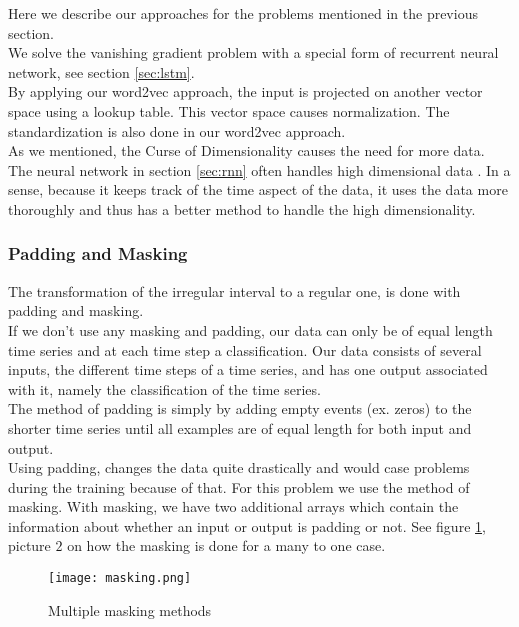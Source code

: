 Here we describe our approaches for the problems mentioned in the previous section. \\
We solve the vanishing gradient problem with a special form of recurrent neural network, see section \ref{sec:lstm}. \\
By applying our word2vec approach, the input is projected on another vector space using a lookup table. This vector space causes normalization. The standardization is also done in our word2vec approach. \\
As we mentioned, the Curse of Dimensionality causes the need for more data. The neural network in section \ref{sec:rnn} often handles high dimensional data \cite{nn1:article} \cite{nn2:article} \cite{nn3:article} \cite{nn4:article}. In a sense, because it keeps track of the time aspect of the data, it uses the data more thoroughly and thus has a better method to handle the high dimensionality.

\subsubsection{Padding and Masking}
The transformation of the irregular interval to a regular one, is done with padding and masking. \\

If we don't use any masking and padding, our data can only be of equal length time series and at each time step a classification. Our data consists of several inputs, the different time steps of a time series, and has one output associated with it, namely the classification of the time series. \\

The method of padding is simply by adding empty events (ex. zeros) to the shorter time series until all examples are of equal length for both input and output. \\
Using padding, changes the data quite drastically and would case problems during the training because of that. For this problem we use the method of masking. With masking, we have two additional arrays which contain the information about whether an input or output is padding or not. See figure \ref{fig:masking}, picture $2$ on how the masking is done for a many to one case.

\begin{figure}[H]
	\centering
	\texttt{[image: masking.png]}
	\caption{Multiple masking methods \cite{dl4jRnn:online}}
	\label{fig:masking}
\end{figure} 



